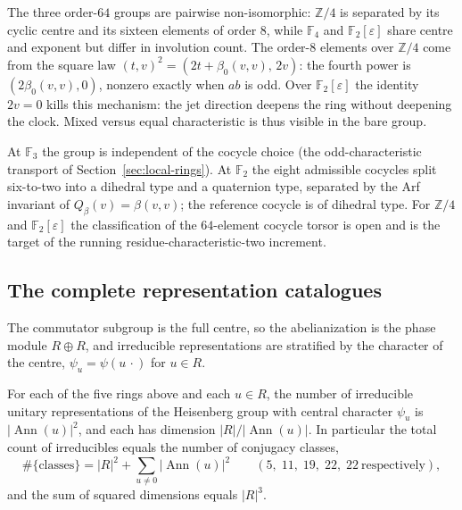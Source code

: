 The three order-$64$ groups are pairwise non-isomorphic: $\mathbb Z/4$ is
separated by its cyclic centre and its sixteen elements of order $8$, while
$\mathbb F_4$ and $\mathbb F_2[\varepsilon]$ share centre and exponent but
differ in involution count.  The order-$8$ elements over $\mathbb Z/4$ come
from the square law $(t,v)^2=(2t+\beta_0(v,v),\,2v)$: the fourth power is
$(2\beta_0(v,v),0)$, nonzero exactly when $ab$ is odd.  Over
$\mathbb F_2[\varepsilon]$ the identity $2v=0$ kills this mechanism: the
jet direction deepens the ring without deepening the clock.  Mixed versus
equal characteristic is thus visible in the bare group.

\begin{remark}
At $\mathbb F_3$ the group is independent of the cocycle choice (the
odd-characteristic transport of Section~\ref{sec:local-rings}).  At
$\mathbb F_2$ the eight admissible cocycles split six-to-two into a
dihedral type and a quaternion type, separated by the Arf invariant of
$Q_\beta(v)=\beta(v,v)$; the reference cocycle is of dihedral type.  For
$\mathbb Z/4$ and $\mathbb F_2[\varepsilon]$ the classification of the
$64$-element cocycle torsor is open and is the target of the running
residue-characteristic-two increment.
\end{remark}


\subsection{The complete representation catalogues}

The commutator subgroup is the full centre, so the abelianization is the
phase module $R\oplus R$, and irreducible representations are stratified by
the character of the centre, $\psi_u=\psi(u\,\cdot)$ for $u\in R$.

\begin{proposition}
\label{prop:catalogue-census}
For each of the five rings above and each $u\in R$, the number of
irreducible unitary representations of the Heisenberg group with central
character $\psi_u$ is $|\operatorname{Ann}(u)|^{2}$, and each has dimension
$|R|/|\operatorname{Ann}(u)|$.  In particular the total count of
irreducibles equals the number of conjugacy classes,
\[
\#\{\text{classes}\}
=|R|^{2}+\sum_{u\neq 0}|\operatorname{Ann}(u)|^{2}
\qquad(5,\;11,\;19,\;22,\;22\ \text{respectively}),
\]
and the sum of squared dimensions equals $|R|^{3}$.
\end{proposition}

